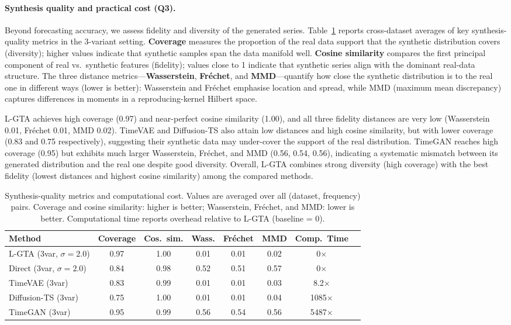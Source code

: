 \paragraph{Synthesis quality and practical cost (Q3).}
Beyond forecasting accuracy, we assess fidelity and diversity of the generated series. Table~\ref{tab:quality-summary} reports cross-dataset averages of key synthesis-quality metrics in the 3-variant setting. \textbf{Coverage} measures the proportion of the real data support that the synthetic distribution covers (diversity); higher values indicate that synthetic samples span the data manifold well. \textbf{Cosine similarity} compares the first principal component of real vs.\ synthetic features (fidelity); values close to 1 indicate that synthetic series align with the dominant real-data structure. The three distance metrics---\textbf{Wasserstein}, \textbf{Fréchet}, and \textbf{MMD}---quantify how close the synthetic distribution is to the real one in different ways (lower is better): Wasserstein and Fréchet emphasise location and spread, while MMD (maximum mean discrepancy) captures differences in moments in a reproducing-kernel Hilbert space.

L-GTA achieves high coverage (0.97) and near-perfect cosine similarity (1.00), and all three fidelity distances are very low (Wasserstein 0.01, Fréchet 0.01, MMD 0.02). TimeVAE and Diffusion-TS also attain low distances and high cosine similarity, but with lower coverage (0.83 and 0.75 respectively), suggesting their synthetic data may under-cover the support of the real distribution. TimeGAN reaches high coverage (0.95) but exhibits much larger Wasserstein, Fréchet, and MMD (0.56, 0.54, 0.56), indicating a systematic mismatch between its generated distribution and the real one despite good diversity. Overall, L-GTA combines strong diversity (high coverage) with the best fidelity (lowest distances and highest cosine similarity) among the compared methods.

\begin{table}[h]
\centering
\caption{Synthesis-quality metrics and computational cost. Values are averaged over all (dataset, frequency) pairs. Coverage and cosine similarity: higher is better; Wasserstein, Fréchet, and MMD: lower is better. Computational time reports overhead relative to L-GTA (baseline = 0).}
\label{tab:quality-summary}
\begin{tabular}{lccccccc}
\toprule
\textbf{Method} & \textbf{Coverage} & \textbf{Cos.\ sim.} & \textbf{Wass.} & \textbf{Fr\'echet} & \textbf{MMD} & \textbf{Comp.\ Time} \\
\midrule
L-GTA (3var, $\sigma{=}2.0$) & 0.97 & 1.00 & 0.01 & 0.01 & 0.02 & 0$\times$ \\
Direct (3var, $\sigma{=}2.0$) & 0.84 & 0.98 & 0.52 & 0.51 & 0.57 & 0$\times$ \\
TimeVAE (3var) & 0.83 & 0.99 & 0.01 & 0.01 & 0.03 & 8.2$\times$ \\
Diffusion-TS (3var) & 0.75 & 1.00 & 0.01 & 0.01 & 0.04 & 1085$\times$ \\
TimeGAN (3var) & 0.95 & 0.99 & 0.56 & 0.54 & 0.56 & 5487$\times$ \\
\bottomrule
\end{tabular}
\end{table}

